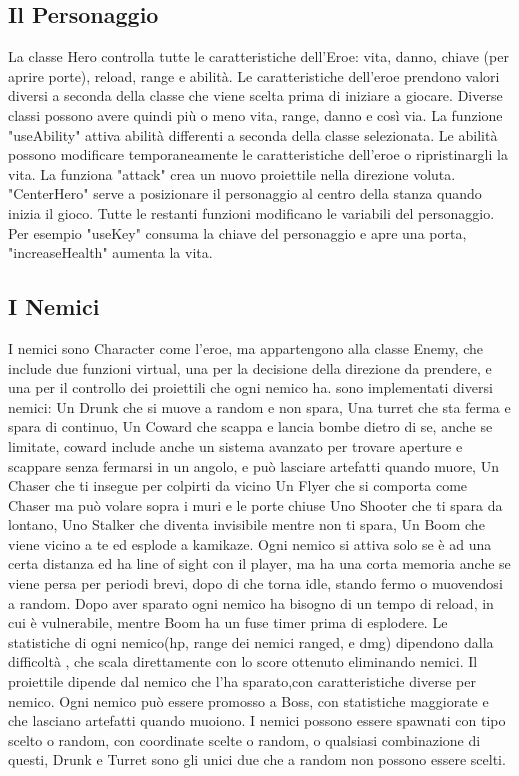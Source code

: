 \documentclass[12pt]{article}
\begin{document}
\subsection*{Il Personaggio}
La classe Hero controlla tutte le caratteristiche dell'Eroe: vita, danno, chiave (per aprire porte), reload, range e abilità.
Le caratteristiche dell'eroe prendono valori diversi a seconda della classe che viene scelta prima di iniziare a giocare. Diverse classi possono avere quindi più o meno vita, range, danno e così via.
La funzione "useAbility" attiva abilità differenti a seconda della classe selezionata.
Le abilità possono modificare temporaneamente le caratteristiche dell'eroe o ripristinargli la vita.
La funziona "attack" crea un nuovo proiettile nella direzione voluta. "CenterHero" serve a posizionare il personaggio al centro della stanza quando inizia il gioco. 
Tutte le restanti funzioni modificano le variabili del personaggio. Per esempio "useKey" consuma la chiave del personaggio e apre una porta, "increaseHealth" aumenta la vita.


\subsection*{I Nemici}
I nemici sono Character come l'eroe, ma appartengono alla classe Enemy, che include due funzioni virtual, una per la decisione della direzione da prendere, e una per il controllo dei proiettili che ogni nemico ha.
sono implementati diversi nemici:
Un Drunk che si muove a random e non spara,
Una turret che sta ferma e spara di continuo,
Un Coward che scappa e lancia bombe dietro di se, anche se limitate, coward include anche un sistema avanzato per trovare aperture e scappare senza fermarsi in un angolo, e può lasciare artefatti quando muore,
Un Chaser che ti insegue per colpirti da vicino 
Un Flyer che si comporta come Chaser ma può volare sopra i muri e le porte chiuse
Uno Shooter che ti spara da lontano,
Uno Stalker che diventa invisibile mentre non ti spara,
Un Boom che viene vicino a te ed esplode a kamikaze.
Ogni nemico si attiva solo se è ad una certa distanza ed ha line of sight con il player, ma ha una corta memoria anche se viene persa per periodi brevi, dopo di che torna idle, stando fermo o muovendosi a random.
Dopo aver sparato ogni nemico ha bisogno di un tempo di reload, in cui è vulnerabile, mentre Boom ha un fuse timer prima di esplodere.
Le statistiche di ogni nemico(hp, range dei nemici ranged, e dmg) dipendono dalla difficoltà , che scala direttamente con lo score ottenuto eliminando nemici.
Il proiettile dipende dal nemico che l'ha sparato,con caratteristiche diverse per nemico.
Ogni nemico può essere promosso a Boss, con statistiche maggiorate e che lasciano artefatti quando muoiono.
I nemici possono essere spawnati con tipo scelto o random, con coordinate scelte o random, o qualsiasi combinazione di questi, Drunk e Turret sono gli unici due che a random non possono essere scelti.
\end{document}
